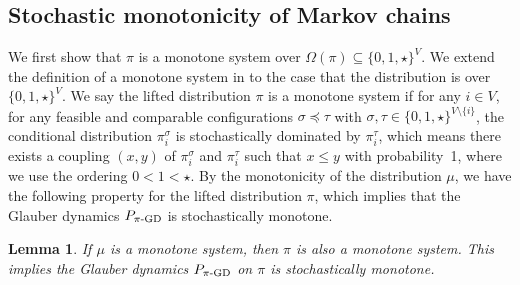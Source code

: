\documentclass[11pt,a4paper]{article}
\newtheorem{lemma}[theorem]{Lemma}
\theoremstyle{definition}
\begin{document}
\subsection{Stochastic monotonicity of Markov chains}\label{sec:proof-stochastically-monotone}
We first show that $\pi$ is a monotone system over $\Omega(\pi) \subseteq \{0,1,\star\}^V$.
We extend the definition of a monotone system in  to the case that the distribution is over $\{0,1,\star\}^V$. We say the lifted distribution $\pi$ is a monotone system if for any $i \in V$, for any feasible and comparable configurations $\sigma\preceq \tau$ with $\sigma,\tau \in \{0,1,\star\}^{V \setminus \{i\}}$, the conditional distribution $\pi^{\sigma}_i$ is stochastically dominated by $\pi^{\tau}_i$, which means there exists a coupling $(x,y)$ of $\pi^{\sigma}_i$ and $\pi^{\tau}_i$ such that $x\leq y$ with probability~1, where we use the ordering $0 < 1 < \star$.
By the monotonicity of the distribution $\mu$, we have the following property for the lifted distribution $\pi$, which implies that the Glauber dynamics $P_{\pi\textnormal{-GD}}$ is stochastically monotone.
\begin{lemma}\label{lem:monotone-pi}
If $\mu$ is a monotone system, then $\pi$ is also a monotone system. This implies the Glauber dynamics $P_{\pi\textnormal{-GD}}$ on $\pi$ is stochastically monotone.
\end{lemma}
\end{document}
